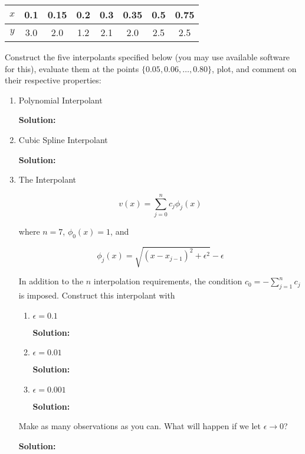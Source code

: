 \documentclass[12pt]{article}
\begin{document}
\begin{enumerate}
\begin{table}[H]
  \centering
  \begin{tabular}{| c | c | c | c | c | c | c | c |}
    $x$ & 0.1 & 0.15 & 0.2 & 0.3 & 0.35 & 0.5 & 0.75\\
    \hline
    $y$ & 3.0 & 2.0 & 1.2 & 2.1 & 2.0 & 2.5 & 2.5
  \end{tabular}
\end{table}

Construct the five interpolants specified below (you may use available software
for this), evaluate them at the points $\{ 0.05, 0.06,\ldots,0.80\}$, plot, and
comment on their respective properties:

\begin{enumerate}
  \item Polynomial Interpolant

  {\bf Solution:}

  \item Cubic Spline Interpolant

  {\bf Solution:}

  \item The Interpolant

  \[
      v(x) = \sum_{j=0}^{n}c_{j}\phi_{j}(x)
  \]

  where $n = 7$, $\phi_{0}(x) = 1$, and

  \[
      \phi_{j}(x) = \sqrt{\left( x - x_{j-1}\right)^{2} + \epsilon^{2}} - \epsilon
  \]

  In addition to the $n$ interpolation requirements, the condition $c_{0} = -\sum_{j=1}^{n}c_{j}$
  is imposed. Construct this interpolant with
    \begin{enumerate}
      \item $\epsilon = 0.1$

      {\bf Solution:}

      \item $\epsilon = 0.01$

      {\bf Solution:}

      \item $\epsilon = 0.001$

      {\bf Solution:}
    \end{enumerate}

  Make as many observations as you can. What will happen if we let $\epsilon \rightarrow 0$?

  {\bf Solution:}


\end{enumerate}

\end{enumerate}
\end{document}
